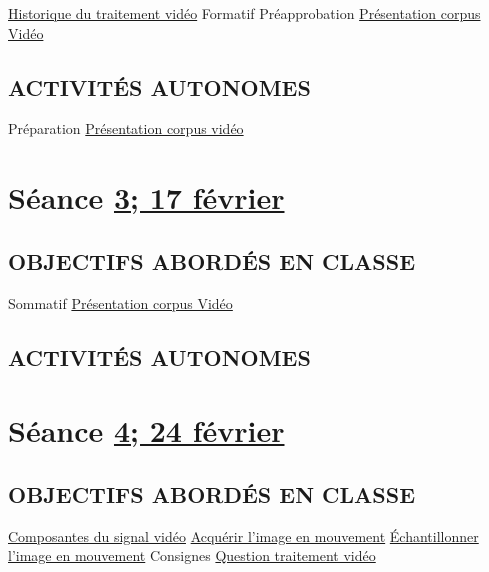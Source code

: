 \documentclass[
  french,
]{book}
\begin{document}
\protect\hyperlink{evolution_historique}{Historique du traitement vidéo}
Formatif Préapprobation \protect\hyperlink{sommatif_1}{Présentation corpus Vidéo}

\hypertarget{activituxe9s-autonomes-1}{%
\subsection{ACTIVITÉS AUTONOMES}\label{activituxe9s-autonomes-1}}

Préparation \protect\hyperlink{sommatif_1}{Présentation corpus vidéo}

\hypertarget{semaine_3}{%
\section{\texorpdfstring{Séance \protect\hyperlink{semaine_3}{3; 17 février}}{Séance 3; 17 février}}\label{semaine_3}}

\hypertarget{objectifs-aborduxe9s-en-classe-2}{%
\subsection{OBJECTIFS ABORDÉS EN CLASSE}\label{objectifs-aborduxe9s-en-classe-2}}

Sommatif \protect\hyperlink{sommatif_1}{Présentation corpus Vidéo}

\hypertarget{activituxe9s-autonomes-2}{%
\subsection{ACTIVITÉS AUTONOMES}\label{activituxe9s-autonomes-2}}

\hypertarget{semaine_4}{%
\section{\texorpdfstring{Séance \protect\hyperlink{semaine_4}{4; 24 février}}{Séance 4; 24 février}}\label{semaine_4}}

\hypertarget{objectifs-aborduxe9s-en-classe-3}{%
\subsection{OBJECTIFS ABORDÉS EN CLASSE}\label{objectifs-aborduxe9s-en-classe-3}}

\protect\hyperlink{lexique}{Composantes du signal vidéo}
\protect\hyperlink{acquerir}{Acquérir l'image en mouvement}
\protect\hyperlink{echantillonner}{Échantillonner l'image en mouvement}
Consignes \protect\hyperlink{sommatif_2}{Question traitement vidéo}
\end{document}

